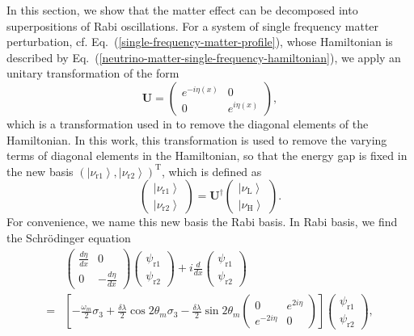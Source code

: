 \documentclass[%
preprint,
 amsmath,amssymb,
 aps,
]{revtex4-1}
\newcommand{\ket}[1]{\left| #1\right\rangle}
\begin{document}
In this section, we show that the matter effect can be decomposed into superpositions of Rabi oscillations. For a system of single frequency matter perturbation, cf. Eq.~(\ref{single-frequency-matter-profile}), whose Hamiltonian is described by Eq.~(\ref{neutrino-matter-single-frequency-hamiltonian}), we apply an unitary transformation of the form
\begin{equation}
    \mathbf{U} =  \begin{pmatrix} e^{-i \eta (x)} & 0 \\  0 & e^{i \eta (x)}  \end{pmatrix},
\end{equation}
which is a transformation used in \cite{Kneller2006} to remove the diagonal elements of the Hamiltonian. In this work, this transformation is used to remove the varying terms of diagonal elements in the Hamiltonian, so that the energy gap is fixed in the new basis $\left(\ket{\nu_{\mathrm{r1}}},\ket{\nu_{\mathrm{r2}}}\right)^{\mathrm{T}}$, which is defined as
\begin{equation}
    \begin{pmatrix} \ket{\nu_{\mathrm{r1}}}\\ \ket{\nu_{\mathrm{r2}}} \end{pmatrix} =  \mathbf{U}^\dagger \begin{pmatrix} \ket{\nu_{\mathrm{L}}} \\ \ket{\nu_{\mathrm{H}}} \end{pmatrix}.
\end{equation}
For convenience, we name this new basis the Rabi basis. In Rabi basis, we find the Schr\"{o}dinger equation
\begin{align*}
    &\begin{pmatrix}  \frac{d\eta}{dx}  & 0 \\ 0 & - \frac{d\eta}{dx}  \end{pmatrix} \begin{pmatrix} \psi_{\mathrm r1} \\ \psi_{\mathrm r2} \end{pmatrix} + i \frac{d}{dx} \begin{pmatrix} \psi_{\mathrm r1} \\ \psi_{\mathrm r2} \end{pmatrix} \\
    =&
\left[ -\frac{\omega_m}{2} \sigma_3  + \frac{\delta \lambda}{2} \cos 2\theta_m  \sigma_3  - \frac{\delta \lambda}{2} \sin 2\theta_m \begin{pmatrix} 0 & e^{2i\eta} \\ e^{-2 i\eta } & 0 \end{pmatrix}   \right] \begin{pmatrix} \psi_{\mathrm r1} \\ \psi_{\mathrm r2} \end{pmatrix},
\end{align*}
\end{document}
